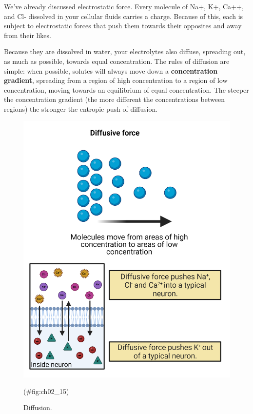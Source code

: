\documentclass[
]{book}
\begin{document}
We've already discussed electrostatic force. Every molecule of Na+, K+, Ca++, and Cl- dissolved in your cellular fluids carries a charge. Because of this, each is subject to electrostatic forces that push them towards their opposites and away from their likes.

Because they are dissolved in water, your electrolytes also diffuse, spreading out, as much as possible, towards equal concentration. The rules of diffusion are simple: when possible, solutes will always move down a \textbf{concentration gradient}, spreading from a region of high concentration to a region of low concentration, moving towards an equilibrium of equal concentration. The steeper the concentration gradient (the more different the concentrations between regions) the stronger the entropic push of diffusion.

\begin{figure}

{\centering \includegraphics[width=0.8\linewidth]{images/ch02/02_15} 

}

\caption{Diffusion.}(\#fig:ch02_15)
\end{figure}
\end{document}
